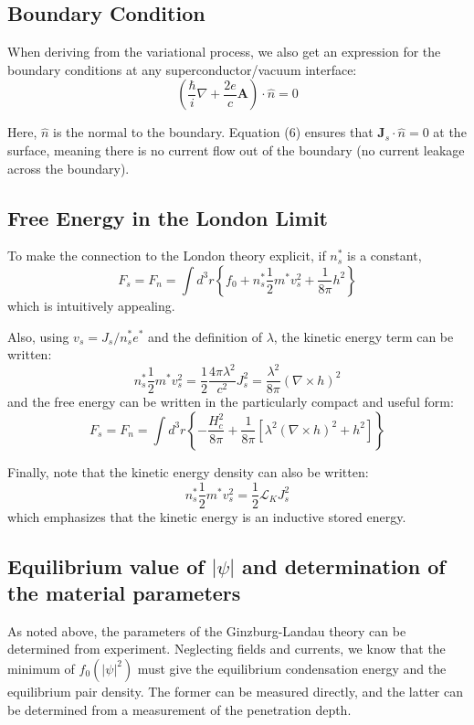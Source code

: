 \documentclass{article}
\begin{document}
\subsection{Boundary Condition}

When deriving from the variational process, we also get an expression for the boundary conditions at any superconductor/vacuum interface:
\begin{equation}
    \left( \frac{\hbar}{i} \nabla + \frac{2e}{c} \mathbf{A} \right) \cdot \hat{n} = 0 \tag{21}
\end{equation}

Here, $\hat{n}$ is the normal to the boundary. Equation (6) ensures that $\mathbf{J}_s \cdot \hat{n} = 0$ at the surface, meaning there is no current flow out of the boundary (no current leakage across the boundary).

\subsection{Free Energy in the London Limit}

To make the connection to the London theory explicit, if $n_s^*$ is a constant, 
\[
F_s = F_n = \int d^3r \left\{ f_0 + n_s^* \frac{1}{2} m^* v_s^2 + \frac{1}{8\pi} h^2 \right\} \tag{25}
\]
which is intuitively appealing.

Also, using $v_s = J_s / n_s^* e^*$ and the definition of $\lambda$, the kinetic energy term can be written:
\[
n_s^* \frac{1}{2} m^* v_s^2 = \frac{1}{2} \frac{4\pi \lambda^2}{c^2} J_s^2 = \frac{\lambda^2}{8\pi} (\nabla \times h)^2 \tag{26}
\]
and the free energy can be written in the particularly compact and useful form:
\[
F_s = F_n = \int d^3r \left\{ -\frac{H_c^2}{8\pi} + \frac{1}{8\pi} \left[ \lambda^2 (\nabla \times h)^2 + h^2 \right] \right\} \tag{27}
\]

Finally, note that the kinetic energy density can also be written:
\[
n_s^* \frac{1}{2} m^* v_s^2 = \frac{1}{2} \mathcal{L}_K J_s^2 \tag{28}
\]
which emphasizes that the kinetic energy is an inductive stored energy.

\subsection{Equilibrium value of $|\psi|$ and determination of the material parameters}

As noted above, the parameters of the Ginzburg-Landau theory can be determined from experiment. Neglecting fields and currents, we know that the minimum of $f_0(|\psi|^2)$ must give the equilibrium condensation energy and the equilibrium pair density. The former can be measured directly, and the latter can be determined from a measurement of the penetration depth.
\end{document}
